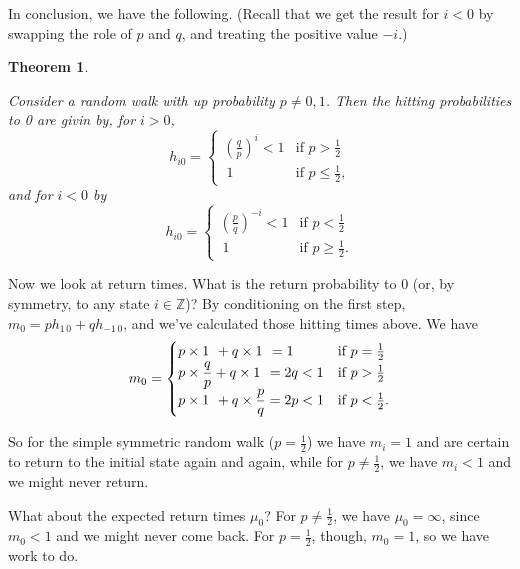 \documentclass[
  a4paper,
]{article}
\newtheorem{theorem}{Theorem}[section]
\theoremstyle{definition}
\theoremstyle{definition}
\theoremstyle{definition}
\theoremstyle{remark}
\begin{document}
In conclusion, we have the following. (Recall that we get the result for \(i < 0\) by swapping the role of \(p\) and \(q\), and treating the positive value \(-i\).)

\begin{theorem}
\protect\hypertarget{thm:rw-hitting}{}\label{thm:rw-hitting}

Consider a random walk with up probability \(p \neq 0, 1\). Then the hitting probabilities to 0 are givin by, for \(i > 0\),
\[ h_{i0} = \begin{cases} \left(\displaystyle\frac{q}{p}\right)^i < 1 & \text{if $p > \frac12$} \\ \ 1 & \text{if $p \leq \frac12$,} \end{cases} \]
and for \(i < 0\) by
\[ h_{i0} = \begin{cases} \left(\displaystyle\frac{p}{q}\right)^{-i} < 1 & \text{if $p < \frac12$} \\ \ 1 & \text{if $p \geq \frac12$.} \end{cases} \]

\end{theorem}

Now we look at return times. What is the return probability to 0 (or, by symmetry, to any state \(i \in \mathbb Z\))? By conditioning on the first step, \(m_0 = ph_{1\,0} + qh_{-1\,0}\), and we've calculated those hitting times above. We have
\[ m_0 = \begin{cases} p\times 1 \hspace{0.4em}+ q\times 1 \hspace{0.4em}= 1 & \text{if $p = \frac12$} \\
p \times \displaystyle\frac qp + q\times 1 \hspace{0.4em}= 2q < 1 & \text{if $p > \frac12$} \\
p\times 1 \hspace{0.4em} + q \times \displaystyle\frac pq = 2p < 1 & \text{if $p < \frac12$.}\end{cases} \]

So for the simple symmetric random walk (\(p = \frac12\)) we have \(m_i = 1\) and are certain to return to the initial state again and again, while for \(p \neq \frac12\), we have \(m_i < 1\) and we might never return.

What about the expected return times \(\mu_{0}\)? For \(p \neq \frac12\), we have \(\mu_{0} = \infty\), since \(m_0 < 1\) and we might never come back. For \(p = \frac12\), though, \(m_0 = 1\), so we have work to do.
\end{document}
